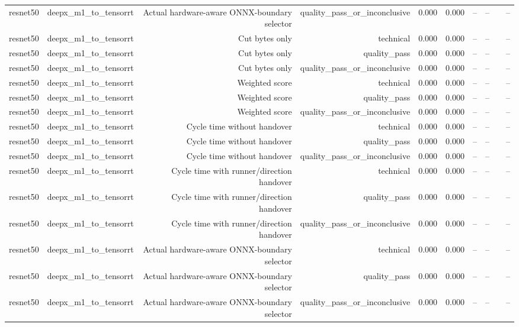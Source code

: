 \begin{table}[t]
\begin{tabular}{lrrrrrrrrr}
resnet50 & deepx\_m1\_to\_tensorrt & Actual hardware-aware ONNX-boundary selector & quality\_pass\_or\_inconclusive & 0.000 & 0.000 & -- & -- &  & -- \\
resnet50 & deepx\_m1\_to\_tensorrt & Cut bytes only & technical & 0.000 & 0.000 & -- & -- &  & -- \\
resnet50 & deepx\_m1\_to\_tensorrt & Cut bytes only & quality\_pass & 0.000 & 0.000 & -- & -- &  & -- \\
resnet50 & deepx\_m1\_to\_tensorrt & Cut bytes only & quality\_pass\_or\_inconclusive & 0.000 & 0.000 & -- & -- &  & -- \\
resnet50 & deepx\_m1\_to\_tensorrt & Weighted score & technical & 0.000 & 0.000 & -- & -- &  & -- \\
resnet50 & deepx\_m1\_to\_tensorrt & Weighted score & quality\_pass & 0.000 & 0.000 & -- & -- &  & -- \\
resnet50 & deepx\_m1\_to\_tensorrt & Weighted score & quality\_pass\_or\_inconclusive & 0.000 & 0.000 & -- & -- &  & -- \\
resnet50 & deepx\_m1\_to\_tensorrt & Cycle time without handover & technical & 0.000 & 0.000 & -- & -- &  & -- \\
resnet50 & deepx\_m1\_to\_tensorrt & Cycle time without handover & quality\_pass & 0.000 & 0.000 & -- & -- &  & -- \\
resnet50 & deepx\_m1\_to\_tensorrt & Cycle time without handover & quality\_pass\_or\_inconclusive & 0.000 & 0.000 & -- & -- &  & -- \\
resnet50 & deepx\_m1\_to\_tensorrt & Cycle time with runner/direction handover & technical & 0.000 & 0.000 & -- & -- &  & -- \\
resnet50 & deepx\_m1\_to\_tensorrt & Cycle time with runner/direction handover & quality\_pass & 0.000 & 0.000 & -- & -- &  & -- \\
resnet50 & deepx\_m1\_to\_tensorrt & Cycle time with runner/direction handover & quality\_pass\_or\_inconclusive & 0.000 & 0.000 & -- & -- &  & -- \\
resnet50 & deepx\_m1\_to\_tensorrt & Actual hardware-aware ONNX-boundary selector & technical & 0.000 & 0.000 & -- & -- &  & -- \\
resnet50 & deepx\_m1\_to\_tensorrt & Actual hardware-aware ONNX-boundary selector & quality\_pass & 0.000 & 0.000 & -- & -- &  & -- \\
resnet50 & deepx\_m1\_to\_tensorrt & Actual hardware-aware ONNX-boundary selector & quality\_pass\_or\_inconclusive & 0.000 & 0.000 & -- & -- &  & -- \\

\end{tabular}
\end{table}
